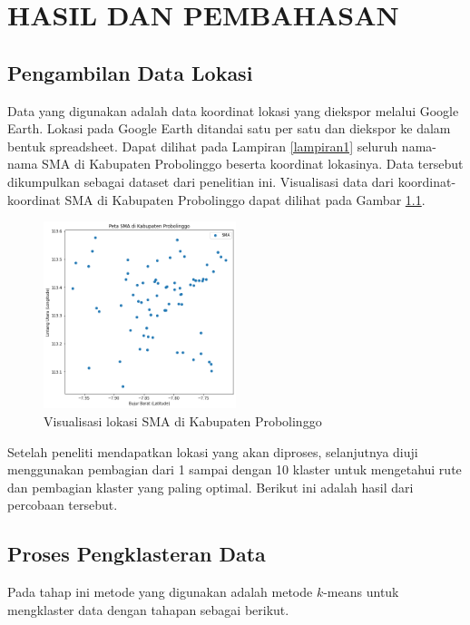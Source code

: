 \chapter{HASIL DAN PEMBAHASAN}

\section{Pengambilan Data Lokasi}

Data yang digunakan adalah data koordinat lokasi yang diekspor melalui Google Earth. Lokasi pada Google Earth ditandai satu per satu dan diekspor ke dalam bentuk spreadsheet. Dapat dilihat pada Lampiran \ref{lampiran1} seluruh nama-nama SMA di Kabupaten Probolinggo beserta koordinat lokasinya. Data tersebut dikumpulkan sebagai dataset dari penelitian ini. Visualisasi data dari koordinat-koordinat SMA di Kabupaten Probolinggo dapat dilihat pada Gambar \ref{fig:petasma}.

\begin{figure}[H]
  \centering
  \includegraphics[width=0.5\textwidth]{Gambar/peta sma.png}
  \caption{Visualisasi lokasi SMA di Kabupaten Probolinggo}
  \label{fig:petasma}
\end{figure}

Setelah peneliti mendapatkan lokasi yang akan diproses, selanjutnya diuji menggunakan pembagian dari 1 sampai dengan 10 klaster untuk mengetahui rute dan pembagian klaster yang paling optimal. Berikut ini adalah hasil dari percobaan tersebut.

\section{Proses Pengklasteran Data}

Pada tahap ini metode yang digunakan adalah metode $k$-means untuk mengklaster data dengan tahapan sebagai berikut.

